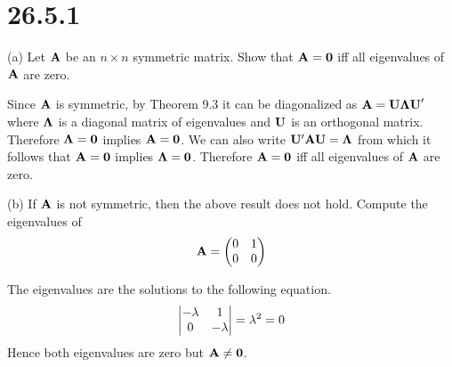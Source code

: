 \section*{26.5.1}
(a) Let $\bf A$ be an $n\times n$ symmetric matrix.
Show that ${\bf A}={\bf 0}$ iff all eigenvalues of $\bf A$ are zero.

\bigskip
\noindent
Since $\bf A$ is symmetric, by Theorem 9.3 it can be diagonalized
as ${\bf A}={\bf U\Lambda U}'$ where $\bf\Lambda$ is a diagonal
matrix of eigenvalues and $\bf U$ is an orthogonal matrix.
Therefore ${\bf\Lambda}=\bf0$ implies ${\bf A}=\bf0$.
We can also write ${\bf U}'{\bf AU}=\bf\Lambda$ from which it follows
that ${\bf A}=\bf0$ implies ${\bf\Lambda=0}$.
Therefore ${\bf A}={\bf 0}$ iff all eigenvalues of $\bf A$ are zero.

\bigskip
\noindent
(b) If $\bf A$ is not symmetric, then the above result does not hold.
Compute the eigenvalues of
$${\bf A}=\left(\begin{matrix}
0 & 1\cr
0 & 0
\end{matrix}\right)
$$

\bigskip
\noindent
The eigenvalues are the solutions to the following equation.
$$\left|\begin{matrix}
-\lambda & 1\cr
0 & -\lambda
\end{matrix}\right|=\lambda^2=0
$$
Hence both eigenvalues are zero but ${\bf A}\ne\bf 0$.
